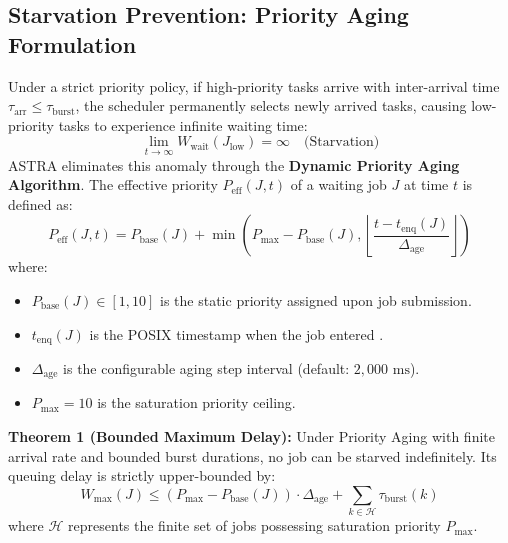 \documentclass[11pt,a4paper]{article}
\DeclareRobustCommand{\code}[1]{\texttt{\detokenize{#1}}}
\begin{document}
\subsection{Starvation Prevention: Priority Aging Formulation}
Under a strict priority policy, if high-priority tasks arrive with inter-arrival time $\tau_{\text{arr}} \le \tau_{\text{burst}}$, the scheduler permanently selects newly arrived tasks, causing low-priority tasks to experience infinite waiting time:
\begin{equation}
    \lim_{t \to \infty} W_{\text{wait}}(J_{\text{low}}) = \infty \quad \text{(Starvation)}
\end{equation}
ASTRA eliminates this anomaly through the \textbf{Dynamic Priority Aging Algorithm}. The effective priority $P_{\text{eff}}(J, t)$ of a waiting job $J$ at time $t$ is defined as:
\begin{equation}
    P_{\text{eff}}(J, t) = P_{\text{base}}(J) + \min\left(P_{\max} - P_{\text{base}}(J), \left\lfloor \frac{t - t_{\text{enq}}(J)}{\Delta_{\text{age}}} \right\rfloor \right)
\end{equation}
where:
\begin{itemize}
    \item $P_{\text{base}}(J) \in [1, 10]$ is the static priority assigned upon job submission.
    \item $t_{\text{enq}}(J)$ is the POSIX timestamp when the job entered \code{JobState::Queued}.
    \item $\Delta_{\text{age}}$ is the configurable aging step interval (default: $2{,}000\text{ ms}$).
    \item $P_{\max} = 10$ is the saturation priority ceiling.
\end{itemize}
\textbf{Theorem 1 (Bounded Maximum Delay):} Under Priority Aging with finite arrival rate and bounded burst durations, no job can be starved indefinitely. Its queuing delay is strictly upper-bounded by:
\begin{equation}
    W_{\max}(J) \le (P_{\max} - P_{\text{base}}(J)) \cdot \Delta_{\text{age}} + \sum_{k \in \mathcal{H}} \tau_{\text{burst}}(k)
\end{equation}
where $\mathcal{H}$ represents the finite set of jobs possessing saturation priority $P_{\max}$.
\end{document}
